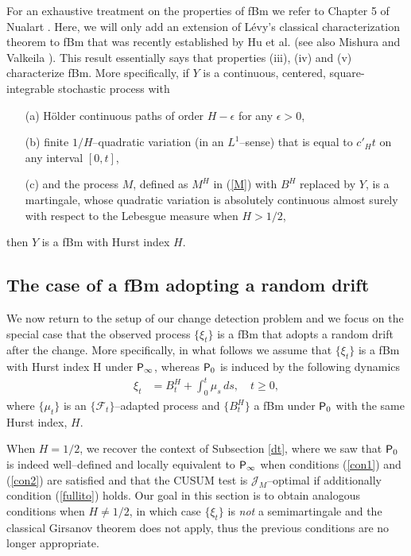 \documentclass[11pt,reqno]{amsart}
\theoremstyle{remark}
\begin{document}
For an exhaustive  treatment on the properties of fBm we refer to Chapter 5 of Nualart \cite{N}. Here, we will only add an extension of L\'evy's classical characterization theorem to fBm that was recently established by Hu et al. \cite{hu} (see also Mishura and Valkeila \cite{mis}). This result essentially says that properties (iii), (iv) and (v) characterize fBm. More specifically, if $Y$ is a continuous, centered, square-integrable stochastic process with 
\begin{itemize}
\item[(a)] H\"older continuous paths of order $H-\epsilon$ for any $\epsilon >0$,
\item[(b)] finite $1/H$--quadratic variation (in an $L^{1}$--sense) that is equal to $c'_{H} t$ on any interval $[0,t]$,
\item[(c)] and the process $M$,  defined as $M^{H}$ in (\ref{M}) with $B^{H}$ replaced by $Y$,  is a martingale, 
whose quadratic variation is absolutely continuous almost surely with respect to the Lebesgue measure when $H>1/2$,
\end{itemize}
then $Y$ is a fBm with Hurst index $H$. 

\subsection{The case of a fBm adopting a random drift}
We now return to the setup of our change detection problem and we focus on the special case that the observed process $\{\xi_{t}\}$ is a fBm that adopts a random drift after the change. More specifically, in what follows we assume that $\{\xi_{t}\}$ is a fBm with Hurst index H under ${{\sf P}}_{\infty}$, whereas 
${{\sf P}}_{0}$ is induced by the following dynamics
\begin{align} \label{sdeY0}
\xi_{t} &= B_{t}^{H}+\int_{0}^{t} \mu_{s} \, ds, \quad t \geq 0,
\end{align}   
where $\{\mu_{t}\}$ is an $\{{\mathcal{F}_{t}}\}$--adapted process and $\{B_{t}^{H}\}$ a fBm  under ${{\sf P}}_{0}$ with the same Hurst index, $H$.

 When $H=1/2$, we recover the context of Subsection \ref{dt}, where we saw that  ${{\sf P}}_{0}$ is indeed  well--defined and locally equivalent to ${{\sf P}}_{\infty}$ when conditions (\ref{con1}) and (\ref{con2}) are satisfied and that the CUSUM test is ${\mathcal{J}}_{M}$--optimal if additionally condition (\ref{fullito}) holds. Our goal in this section is to obtain analogous conditions when $H \neq 1/2$, in which case $\{\xi_{t}\}$ is \textit{not} a semimartingale and the classical Girsanov theorem does not apply, thus the previous conditions are no longer appropriate. 
 
\end{document}
